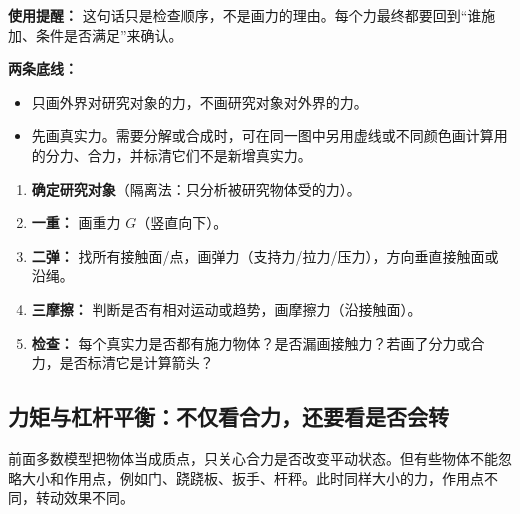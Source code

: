 \textbf{使用提醒：} 这句话只是检查顺序，不是画力的理由。每个力最终都要回到“谁施加、条件是否满足”来确认。

\textbf{两条底线：}
\begin{itemize}
  \item 只画外界对研究对象的力，不画研究对象对外界的力。
  \item 先画真实力。需要分解或合成时，可在同一图中另用虚线或不同颜色画计算用的分力、合力，并标清它们不是新增真实力。
\end{itemize}

\begin{enumerate}
  \item \textbf{确定研究对象}（隔离法：只分析被研究物体受的力）。
  \item \textbf{一重：} 画重力 $G$（竖直向下）。
  \item \textbf{二弹：} 找所有接触面/点，画弹力（支持力/拉力/压力），方向垂直接触面或沿绳。
  \item \textbf{三摩擦：} 判断是否有相对运动或趋势，画摩擦力（沿接触面）。
  \item \textbf{检查：} 每个真实力是否都有施力物体？是否漏画接触力？若画了分力或合力，是否标清它是计算箭头？
\end{enumerate}

\begin{center}


\label{fig:force-horizontal}
\end{center}

\begin{center}


\label{fig:force-incline}
\end{center}

\subsection*{力矩与杠杆平衡：不仅看合力，还要看是否会转}

前面多数模型把物体当成质点，只关心合力是否改变平动状态。但有些物体不能忽略大小和作用点，例如门、跷跷板、扳手、杆秤。此时同样大小的力，作用点不同，转动效果不同。

\begin{center}


\label{fig:lever-torque-balance}
\end{center}


